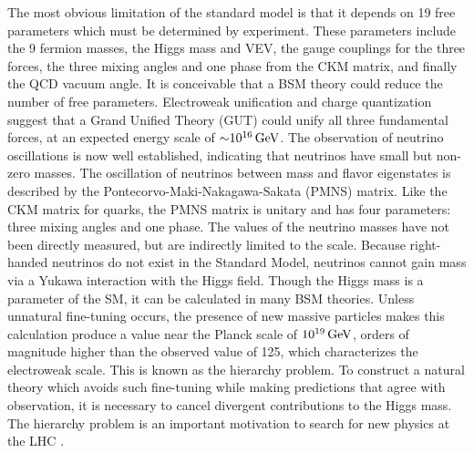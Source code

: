 The most obvious limitation of the standard model is that it depends on 19 free parameters which must be determined by experiment. These parameters include the 9 fermion masses, the Higgs mass and VEV, the gauge couplings for the three forces, the three mixing angles and one phase from the CKM matrix, and finally the QCD vacuum angle. It is conceivable that a BSM theory could reduce the number of free parameters. Electroweak unification and charge quantization suggest that a Grand Unified Theory (GUT) could unify all three fundamental forces, at an expected energy scale of ${\sim} 10^{16}\,\text{Ge\hspace{-.08em}V}$. The observation of neutrino oscillations is now well established, indicating that neutrinos have small but non-zero masses. The oscillation of neutrinos between mass and flavor eigenstates is described by the Pontecorvo-Maki-Nakagawa-Sakata (PMNS) matrix. Like the CKM matrix for quarks, the PMNS matrix is unitary and has four parameters: three mixing angles and one phase. The values of the neutrino masses have not been directly measured, but are indirectly limited to the \eVns scale. Because right-handed neutrinos do not exist in the Standard Model, neutrinos cannot gain mass via a Yukawa interaction with the Higgs field. Though the Higgs mass is a parameter of the SM, it can be calculated in many BSM theories. Unless unnatural fine-tuning occurs, the presence of new massive particles makes this calculation produce a value near the Planck scale of $10^{19}\,\text{Ge\hspace{-.08em}V}$, orders of magnitude higher than the observed value of 125\GeV, which characterizes the electroweak scale. This is known as the hierarchy problem. To construct a natural theory which avoids such fine-tuning while making predictions that agree with observation, it is necessary to cancel divergent contributions to the Higgs mass. The hierarchy problem is an important motivation to search for new physics at the LHC \cite{Morrissey20121}.


